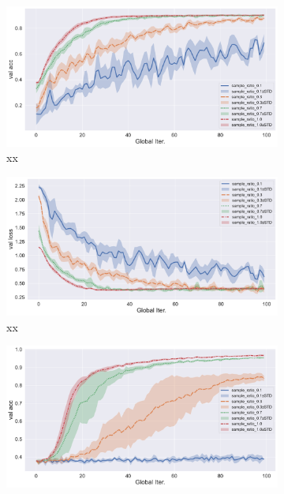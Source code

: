 \begin{figure}[ht]
\centering
\begin{subfigure}{.5\textwidth}
  \centering
  \includegraphics[width=.95\linewidth]{figures/fedprox-compare-sample-ratio-val-acc.pdf}
  \caption{xx}
  \label{fig:fedprox-compare-sample-ratio-val-acc}
\end{subfigure}%
\begin{subfigure}{.5\textwidth}
  \centering
  \includegraphics[width=.95\linewidth]{figures/fedprox-compare-sample-ratio-val-loss.pdf}
  \caption{xx}
  \label{fig:fedprox-compare-sample-ratio-val-loss}
\end{subfigure}
\begin{subfigure}{.5\textwidth}
  \centering
  \includegraphics[width=.95\linewidth]{figures/proxskip-compare-sample-ratio-val-acc.pdf}

\end{subfigure}
\end{figure}
